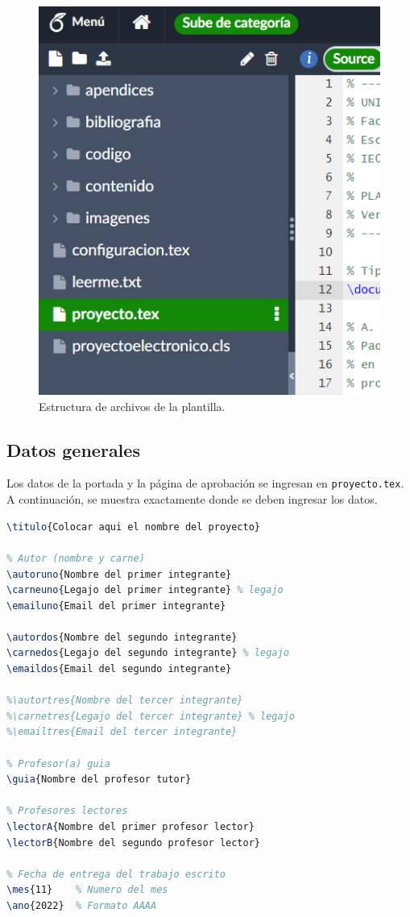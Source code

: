 \clearpage
\begin{figure}
    \centering
    \includegraphics[scale=0.8]{./imagenes/estructura_de_archivos.png}
    \caption{Estructura de archivos de la plantilla.}
    \label{F:estructura_archivos}
\end{figure}



\clearpage
\subsection{Datos generales}

Los datos de la portada y la página de aprobación se ingresan en \texttt{proyecto.tex}. A continuación, se muestra exactamente donde se deben ingresar los datos.

\footnotesize
\begin{lstlisting}[language=TeX, numbers=none]
% Titulo del proyecto
\titulo{Colocar aqui el nombre del proyecto}

% Autor (nombre y carne)
\autoruno{Nombre del primer integrante}
\carneuno{Legajo del primer integrante} % legajo
\emailuno{Email del primer integrante}

\autordos{Nombre del segundo integrante}
\carnedos{Legajo del segundo integrante} % legajo
\emaildos{Email del segundo integrante}

%\autortres{Nombre del tercer integrante}
%\carnetres{Legajo del tercer integrante} % legajo
%\emailtres{Email del tercer integrante}

% Profesor(a) guia
\guia{Nombre del profesor tutor}

% Profesores lectores 
\lectorA{Nombre del primer profesor lector}
\lectorB{Nombre del segundo profesor lector}

% Fecha de entrega del trabajo escrito
\mes{11}	% Numero del mes
\ano{2022}	% Formato AAAA
\end{lstlisting}
\normalsize

